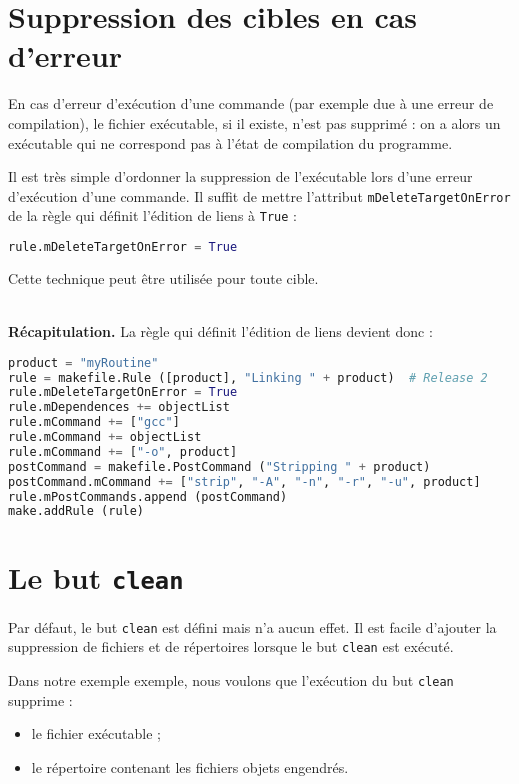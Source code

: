 \documentclass[a4paper,11pt]{extarticle}
\begin{document}
\section{Suppression des cibles en cas d'erreur}

En cas d'erreur d'exécution d'une commande (par exemple due à une erreur de compilation), le fichier exécutable, si il existe, n'est pas supprimé : on a alors un exécutable qui ne correspond pas à l'état de compilation du programme.

Il est très simple d'ordonner la suppression de l'exécutable lors d'une erreur d'exécution d'une commande. Il suffit de mettre l'attribut \texttt{mDeleteTargetOnError} de la règle qui définit l'édition de liens à \texttt{True} :
\begin{lstlisting}[language=py]
rule.mDeleteTargetOnError = True
\end{lstlisting}
Cette technique peut être utilisée pour toute cible.

~\\{\bf Récapitulation.} La règle qui définit l'édition de liens devient donc :
\begin{lstlisting}[language=py]
product = "myRoutine"
rule = makefile.Rule ([product], "Linking " + product)  # Release 2
rule.mDeleteTargetOnError = True
rule.mDependences += objectList
rule.mCommand += ["gcc"]
rule.mCommand += objectList
rule.mCommand += ["-o", product]
postCommand = makefile.PostCommand ("Stripping " + product)
postCommand.mCommand += ["strip", "-A", "-n", "-r", "-u", product]
rule.mPostCommands.append (postCommand)
make.addRule (rule)
\end{lstlisting}







\section{Le but \texttt{clean}}

Par défaut, le but \texttt{clean} est défini mais n'a aucun effet. Il est facile d'ajouter la suppression de fichiers et de répertoires lorsque le but \texttt{clean} est exécuté.

Dans notre exemple exemple, nous voulons que l'exécution du but \texttt{clean} supprime :
\begin{itemize}
  \item le fichier exécutable ;
  \item le répertoire contenant les fichiers objets engendrés.
\end{itemize}
\end{document}
